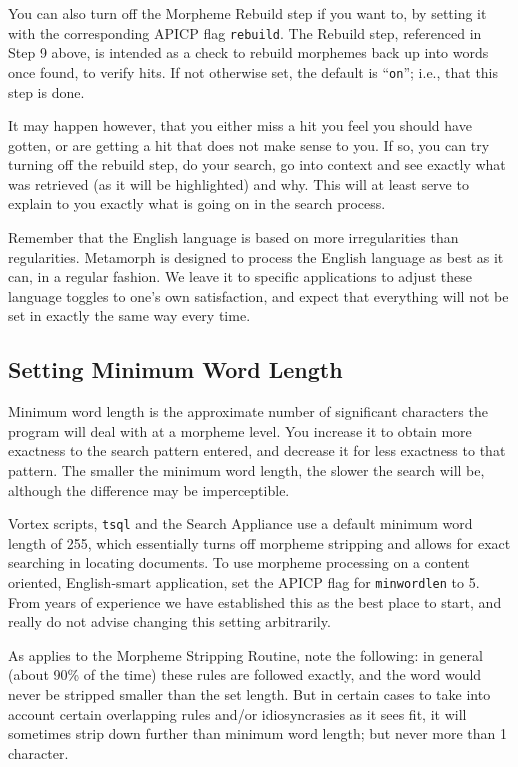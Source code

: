 You can also turn off the Morpheme Rebuild step if you want to, by
setting it with the corresponding APICP flag \verb`rebuild`.  The
Rebuild step, referenced in Step 9 above, is intended as a check to
rebuild morphemes back up into words once found, to verify hits.  If
not otherwise set, the default is ``\verb`on`''; i.e., that this step
is done.

It may happen however, that you either miss a hit you feel you should
have gotten, or are getting a hit that does not make sense to you.  If
so, you can try turning off the rebuild step, do your search, go into
context and see exactly what was retrieved (as it will be highlighted)
and why.  This will at least serve to explain to you exactly what is
going on in the search process.

Remember that the English language is based on more irregularities
than regularities.  Metamorph is designed to process the English
language as best as it can, in a regular fashion.  We leave it to
specific applications to adjust these language toggles to one's own
satisfaction, and expect that everything will not be set in exactly
the same way every time.

\subsection{Setting Minimum Word Length}{\label{set:minwrdlen}}

Minimum word length is the approximate number of significant
characters the program will deal with at a morpheme level.  You
increase it to obtain more exactness to the search pattern entered,
and decrease it for less exactness to that pattern.  The smaller the
minimum word length, the slower the search will be, although the
difference may be imperceptible.

Vortex scripts, \verb`tsql` and the Search Appliance use a default
minimum word length of 255, which essentially turns off morpheme
stripping and allows for exact searching in locating documents.  To
use morpheme processing on a content oriented, English-smart
application, set the APICP flag for \verb`minwordlen` to 5. From years
of experience we have established this as the best place to start, and
really do not advise changing this setting arbitrarily.

As applies to the Morpheme Stripping Routine, note the following:  in
general (about 90\% of the time) these rules are followed exactly, and
the word would never be stripped smaller than the set length.  But in
certain cases to take into account certain overlapping rules and/or
idiosyncrasies as it sees fit, it will sometimes strip down further
than minimum word length; but never more than 1 character.

